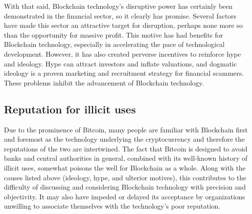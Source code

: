 With that said, Blockchain technology's disruptive power has certainly been demonstrated in the financial sector, so it clearly has promise. Several factors have made this sector an attractive target for disruption, perhaps none more so than the opportunity for massive profit. This motive has had benefits for Blockchain technology, especially in accelerating the pace of technological development. However, it has also created perverse incentives to reinforce hype and ideology. Hype can attract investors and inflate valuations, and dogmatic ideology is a proven marketing and recruitment strategy for financial scammers. These problems inhibit the advancement of Blockchain technology.

\subsection{Reputation for illicit uses}
Due to the prominence of Bitcoin, many people are familiar with Blockchain first and foremost as the technology underlying the cryptocurrency and therefore the reputations of the two are intertwined. The fact that Bitcoin is designed to avoid banks and central authorities in general, combined with its well-known history of illicit uses, somewhat poisons the well for Blockchain as a whole. Along with the causes listed above (ideology, hype, and ulterior motives), this contributes to the difficulty of discussing and considering Blockchain technology with precision and objectivity. It may also have impeded or delayed its acceptance by organizations unwilling to associate themselves with the technology's poor reputation.

